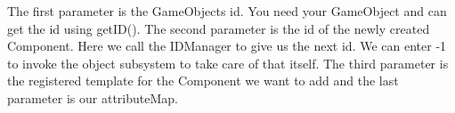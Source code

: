 \documentclass{article}
\begin{document}
The first parameter is the GameObjects id. You need your GameObject and can get the id using getID(). The second parameter is the id of the newly created Component. Here we call the IDManager to give us the next id. We can enter -1 to invoke the object subsystem to take care of that itself. The third parameter is the registered template for the Component we want to add and the last parameter is our attributeMap.
\end{document}
